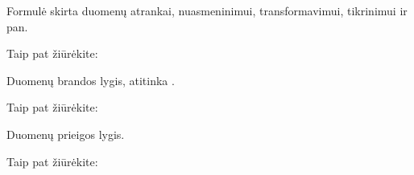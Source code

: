 \documentclass[letterpaper,10pt,lithuanian]{sphinxmanual}
\begin{document}
\begin{fulllineitems}
\label{\detokenize{formatas:prepare}}
\pysigstartsignatures
{}
\pysigstopsignatures
\sphinxAtStartPar
{}

\sphinxAtStartPar
Formulė skirta duomenų atrankai, nuasmeninimui, transformavimui, tikrinimui
ir pan.


\begin{sphinxseealso}{Taip pat žiūrėkite:}

\sphinxAtStartPar
{\hyperref[\detokenize{formules:formules}]{}}


\end{sphinxseealso}


\end{fulllineitems}


\begin{fulllineitems}
\label{\detokenize{formatas:level}}
\pysigstartsignatures
{}
\pysigstopsignatures
\sphinxAtStartPar
{}

\sphinxAtStartPar
Duomenų brandos lygis, atitinka .


\begin{sphinxseealso}{Taip pat žiūrėkite:}

\sphinxAtStartPar
{\hyperref[\detokenize{branda:level}]{}}


\end{sphinxseealso}


\end{fulllineitems}


\begin{fulllineitems}
\label{\detokenize{formatas:access}}
\pysigstartsignatures
{}
\pysigstopsignatures
\sphinxAtStartPar
{}

\sphinxAtStartPar
Duomenų prieigos lygis.


\begin{sphinxseealso}{Taip pat žiūrėkite:}

\sphinxAtStartPar
{\hyperref[\detokenize{prieiga:access}]{}}


\end{sphinxseealso}


\end{fulllineitems}
\end{document}
